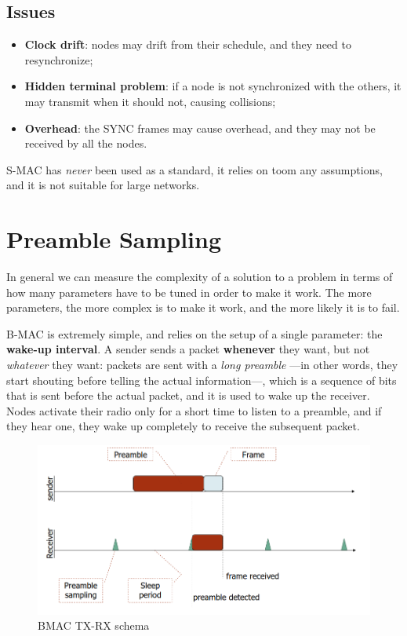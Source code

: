 \subsection{Issues}
\begin{itemize}
   \item \textbf{Clock drift}: nodes may drift from their schedule, and they need to resynchronize;
   \item \textbf{Hidden terminal problem}: if a node is not synchronized with the others, it may transmit when it should not, causing collisions;
   \item \textbf{Overhead}: the SYNC frames may cause overhead, and they may not be received by all the nodes.
\end{itemize}

S-MAC has \textit{never} been used as a standard, it relies on toom any assumptions, and it is not suitable for large networks.

\section{Preamble Sampling}
In general we can measure the complexity of a solution to a problem in terms of how many parameters have to be tuned in order to make it work.
The more parameters, the more complex is to make it work, and the more likely it is to fail.
\begin{paracol}{2}
   
   B-MAC is extremely simple, and relies on the setup of a single parameter: the \textbf{wake-up interval}.
   A sender sends a packet \textbf{whenever} they want, but not \textit{whatever} they want:
   packets are sent with a \textit{long preamble} ---in other words, they start shouting before telling the actual information---, which is a sequence of bits that is sent before the actual packet, and it is used to wake up the receiver.\\
   Nodes activate their radio only for a short time to listen to a preamble, and if they hear one, they wake up completely to receive the subsequent packet.

   \switchcolumn
   
   \begin{figure}[htbp]
      \centering
      \includegraphics{images/BMAC.png}
      \caption{BMAC TX-RX schema}
      \label{fig:BMAC}
   \end{figure}
\end{paracol}

